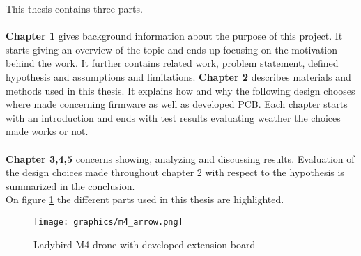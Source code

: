 This thesis contains three parts.\\ \\
\textbf{Chapter 1} gives background information about the purpose of this project. It starts giving an overview of the topic and ends up focusing on the motivation behind the work. It further contains related work,  problem statement, defined hypothesis and assumptions and limitations.
\textbf{Chapter 2} describes materials and methods used in this thesis. It explains how and why the following design chooses where made concerning firmware as well as developed PCB. Each chapter starts with an introduction and ends with test results evaluating weather the choices made works or not.\\ \\
\textbf{Chapter 3,4,5} concerns showing, analyzing and discussing results. Evaluation of the design choices made throughout chapter 2 with respect to the hypothesis is summarized in the conclusion. \\


On figure \ref{fig:drone_with_arrows} the different parts used in this thesis are highlighted.

\begin{figure}[H]
    \center
    \texttt{[image: graphics/m4\_arrow.png]}
  \caption{Ladybird M4 drone with developed extension board}
  \label{fig:drone_with_arrows}
\end{figure}

